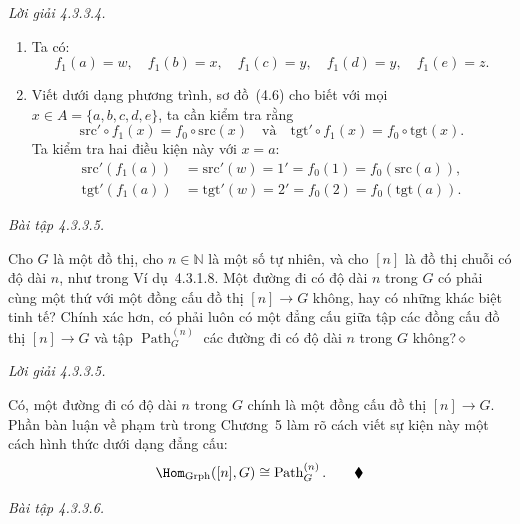 \noindent\textit{Lời giải 4.3.3.4.}\keepwithnext
\begin{enumerate}[label=\alph*.]
\item Ta có:
\[
f_1(a)=w,\quad f_1(b)=x,\quad f_1(c)=y,\quad f_1(d)=y,\quad f_1(e)=z.
\]
\item Viết dưới dạng phương trình, sơ đồ~(4.6) cho biết với mọi $x\in A=\{a,b,c,d,e\}$, ta cần kiểm tra rằng
\[
\mathrm{src}'\circ f_1(x)=f_0\circ\mathrm{src}(x)
\quad\text{và}\quad
\mathrm{tgt}'\circ f_1(x)=f_0\circ\mathrm{tgt}(x).
\]
Ta kiểm tra hai điều kiện này với $x=a$:
\begin{align*}
\mathrm{src}'(f_1(a))&=\mathrm{src}'(w)=1'=f_0(1)=f_0(\mathrm{src}(a)),\\
\mathrm{tgt}'(f_1(a))&=\mathrm{tgt}'(w)=2'=f_0(2)=f_0(\mathrm{tgt}(a)).
\tag*{$\blacklozenge$}
\end{align*}
\end{enumerate}

\noindent\textit{Bài tập 4.3.3.5.}\keepwithnext

Cho $G$ là một đồ thị, cho $n\in\mathbb{N}$ là một số tự nhiên, và cho $[n]$ là đồ thị chuỗi có độ dài $n$, như trong Ví dụ~4.3.1.8. Một đường đi có độ dài $n$ trong $G$ có phải cùng một thứ với một đồng cấu đồ thị $[n]\to G$ không, hay có những khác biệt tinh tế? Chính xác hơn, có phải luôn có một đẳng cấu giữa tập các đồng cấu đồ thị $[n]\to G$ và tập $\operatorname{Path}_G^{(n)}$ các đường đi có độ dài $n$ trong $G$ không?\hfill$\diamond$

\noindent\textit{Lời giải 4.3.3.5.}\keepwithnext

Có, một đường đi có độ dài $n$ trong $G$ chính là một đồng cấu đồ thị $[n]\to G$. Phần bàn luận về phạm trù trong Chương~5 làm rõ cách viết sự kiện này một cách hình thức dưới dạng đẳng cấu:
\[
\Hom_{\mathrm{Grph}}([n],G)\cong\operatorname{Path}_G^{(n)}.
\tag*{$\blacklozenge$}
\]

\noindent\textit{Bài tập 4.3.3.6.}\keepwithnext

